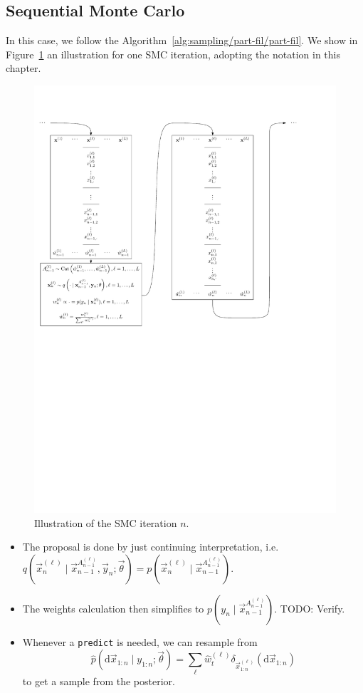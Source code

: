 \subsection{Sequential Monte Carlo}
In this case, we follow the Algorithm~\ref{alg:sampling/part-fil/part-fil}. We show in Figure~\ref{fig:pprog/how/figures/smc} an illustration for one SMC iteration, adopting the notation in this chapter.
\begin{figure}[!htb]
\centering
\includegraphics[scale=0.75]{pprog/how/figures/smc/smc}
\caption{Illustration of the SMC iteration $n$.}
\label{fig:pprog/how/figures/smc}
\end{figure}

\begin{itemize}
	\item The proposal is done by just continuing interpretation, i.e. $q\left(\vec x_n^{(\ell)} \mid \vec x_{n - 1}^{A_{n - 1}^{(\ell)}}, \vec y_n; \vec \theta\right) = p\left(\vec x_n^{(\ell)} \mid \vec x_{n - 1}^{A_{n - 1}^{(\ell)}} \right)$.
	\item The weights calculation then simplifies to $p\left(y_n \mid \vec x_{n - 1}^{A_{n - 1}^{(\ell)}}\right)$. TODO: Verify.
	\item Whenever a \verb!predict! is needed, we can resample from
		\begin{equation*}
			\hat p(\mathrm d \vec x_{1:n} \mid y_{1:n}; \vec \theta) = \sum_\ell \hat w_t^{(\ell)} \delta_{\vec x_{1:n}^{(\ell)}}(\mathrm d \vec x_{1:n})
		\end{equation*}
		to get a sample from the posterior.
\end{itemize}